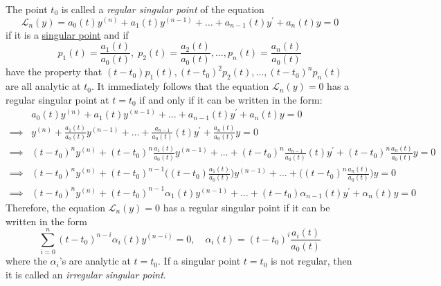 \documentclass{article}
\newcounter{definition}[section]
\begin{document}
    \begin{definition}
      \label{def:regular-singular-point}
    The point $t_0$ is called a \textit{regular singular point} of the equation 
    \begin{equation}
      \mathcal{L}_n (y) = a_0 (t) y^{(n)} + a_1 (t) y^{(n-1)} + \ldots + a_{n-1} (t) y^\prime + a_n (t) y = 0
    \end{equation}
    if it is a \hyperref[def:singular-point]{singular point} and if 
    \begin{equation}
      p_1 (t) = \frac{a_1 (t)}{a_0 (t)}, \; p_2 (t) = \frac{a_2 (t)}{a_0 (t)}, \ldots, p_n (t) = \frac{a_n (t)}{a_0 (t)}
    \end{equation}
    have the property that $(t - t_0) p_1 (t), (t - t_0)^2 p_2 (t), \ldots, (t - t_0)^n p_n (t)$ are all analytic at $t_0$. It immediately follows that the equation $\mathcal{L}_n (y) = 0$ has a regular singular point at $t = t_0$ if and only if it can be written in the form:
    \begin{align*}
        & a_0 (t) y^{(n)} + a_1 (t) y^{(n-1)} + \ldots + a_{n-1} (t) y^\prime + a_n (t) y = 0\\
        \implies & y^{(n)} + \frac{a_1 (t)}{a_0 (t)} y^{(n-1)} + \ldots + \frac{a_{n-1}}{a_0 (t)} (t) y^\prime + \frac{a_n (t)}{a_0 (t)} y = 0 \\
        \implies & (t - t_0)^n y^{(n)} + (t - t_0)^n \frac{a_1 (t)}{a_0 (t)} y^{(n-1)} + \ldots + (t - t_0)^n \frac{a_{n-1}}{a_0 (t)} (t) y^\prime + (t - t_0)^n \frac{a_n (t)}{a_0 (t)} y = 0 \\
        \implies & (t - t_0)^n y^{(n)} + (t - t_0)^{n-1} \bigg((t-t_0) \frac{a_1 (t)}{a_0 (t)}\bigg) y^{(n-1)} + \ldots + \bigg( (t-t_0)^n \frac{a_n (t)}{a_0 (t)} \bigg) y = 0 \\
        \implies & (t - t_0)^n y^{(n)} + (t - t_0)^{n-1} \alpha_1 (t) y^{(n-1)} + \ldots + (t - t_0) \alpha_{n-1} (t) y^\prime + \alpha_n (t) y = 0
    \end{align*}
    Therefore, the equation $\mathcal{L}_n (y) = 0$ has a regular singular point if it can be written in the form
    \begin{equation}
      \sum_{i=0}^n (t - t_0)^{n-i} \alpha_i (t) y^{(n-i)} = 0, \quad \alpha_i (t) = (t - t_0)^i \frac{a_i (t)}{a_0 (t)}
    \end{equation}
    where the $\alpha_i$'s are analytic at $t = t_0$. If a singular point $t = t_0$ is not regular, then it is called an \textit{irregular singular point}. 
    \end{definition}
\end{document}
